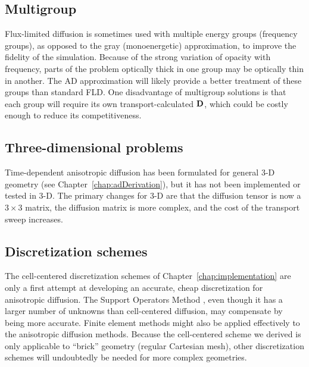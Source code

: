 
\subsection{Multigroup}

Flux-limited diffusion is sometimes used with multiple energy groups (frequency
groups), as opposed to the gray (monoenergetic) approximation, to improve the
fidelity of the simulation. Because of the strong variation of opacity with
frequency, parts of the problem optically thick in one group may be optically
thin in another. The AD approximation will likely provide a better treatment of
these groups than standard FLD. One disadvantage of multigroup solutions is that
each group will require its own transport-calculated $\mathbf{D}$, which could be
costly enough to reduce its competitiveness.

\subsection{Three-dimensional problems}

Time-dependent anisotropic diffusion has been formulated for general
3-D geometry (see Chapter~\ref{chap:adDerivation}), but it has not
been implemented or tested in 3-D. The primary changes for 3-D are that the
diffusion tensor is now a $3\times 3$ matrix, the diffusion matrix is more
complex, and the cost of the transport sweep increases.

\subsection{Discretization schemes}

The cell-centered discretization schemes of Chapter~\ref{chap:implementation}
are only a first attempt at developing an accurate, cheap discretization for
anisotropic diffusion. The Support Operators Method
\cite{Mor1998,Run2006}, even though it has a larger number of unknowns than
cell-centered diffusion, may compensate by being more accurate. Finite element
methods might also be applied effectively to the anisotropic diffusion methods.
Because the cell-centered scheme we derived is only applicable to ``brick''
geometry (regular Cartesian mesh), other discretization schemes will undoubtedly
be needed for more complex geometries.


